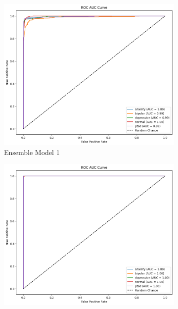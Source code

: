 \pagebreak

\begin{figure}[H]
    \centering
    \begin{subfigure}[b]{0.49\textwidth}
        \centering
        \includegraphics[width=\textwidth]{Images/EM ROC.png}
        \caption{Ensemble Model 1}
        \label{dfdl12443}  %
    \end{subfigure}
    \hfill
    \begin{subfigure}[b]{0.47\textwidth}
        \centering
        \includegraphics[width=\textwidth]{Images/EM2 ROC.png}

\end{subfigure}
\end{figure}
